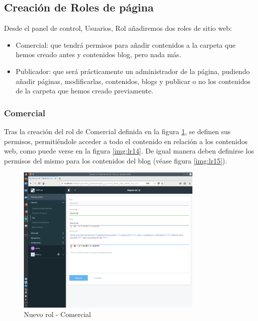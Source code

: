 \subsection{Creación de Roles de página}
Desde el panel de control, Usuarios, Rol añadiremos dos roles de sitio web:
\begin{itemize}[-]
    \item Comercial: que tendrá permisos para añadir contenidos a la carpeta que hemos creado antes y contenidos blog, pero nada más.
    \item Publicador: que será prácticamente un administrador de la página, pudiendo añadir páginas, modificarlas, contenidos, blogs y publicar o no los contenidos de la carpeta que hemos creado previamente.
\end{itemize}

\subsubsection{Comercial}
\par Tras la creación del rol de Comercial definida en la figura \ref{img:lr13}, se definen sus permisos, permitiéndole acceder a todo el contenido en relación a los contenidos web, como puede verse en la figura \ref{img:lr14}. De igual manera deben definirse los permisos del mismo para los contenidos del blog (véase figura \ref{img:lr15}).

\begin{figure}[H]
\begin{center}
\includegraphics[width=0.8\textwidth]{./img/liferay/13.png}
\end{center}
\caption{Nuevo rol - Comercial}
\label{img:lr13}
\end{figure}

